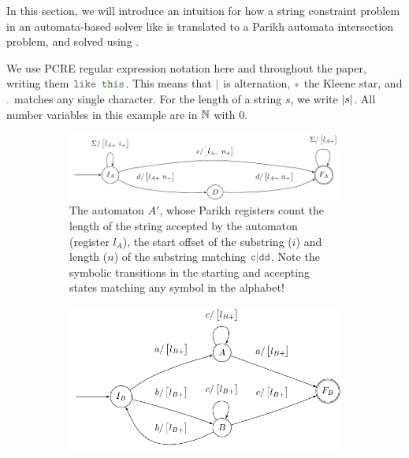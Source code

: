 In this section, we will introduce an intuition for how a string constraint
problem in an automata-based solver like \OstrichPlus{} is translated to a
Parikh automata intersection problem, and solved using \Calculus{}.

We use PCRE regular expression notation here and throughout the paper, writing
them $\Regex{\texttt{like this}}$. This means that $\Regex{\RegexOr{}}$ is alternation,
$\Regex{\mathtt{*}}$ the Kleene star, and $\Regex{\mathtt{.}}$ matches any single character.
For the length of a string $s$, we write $|s|$. All number variables in
this example are in $\mathbb{N}$ with $0$.

\newcommand{\autscale}[0]{0.48}

\begin{figure}[ht]
    \centering 
  \begin{subfigure}[b]{\autscale\textwidth}
    \centering
    \includegraphics[width=\textwidth]{a}
    \caption{The automaton $A'$, whose Parikh registers count the length of the
    string accepted by the automaton (register $l_A$), the start offset of the
    substring ($i$) and length ($n$) of the substring matching
    $\Regex{c\RegexOr{}dd}$. Note the symbolic transitions in the starting and
    accepting states matching any symbol in the alphabet!}\label{fig:aut_a}
  \end{subfigure}%
  \hfill%
  \begin{subfigure}[b]{\autscale\textwidth}
    \centering
    \includegraphics[width=\textwidth]{b}

\end{subfigure}
\end{figure}
